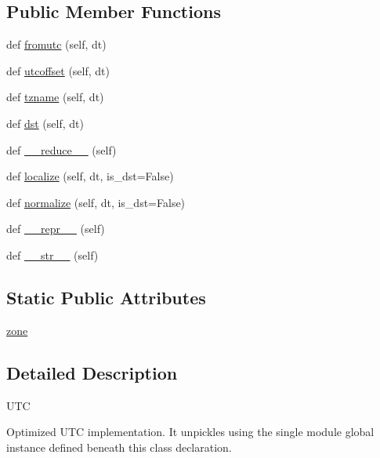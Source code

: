 \subsection*{Public Member Functions}
\begin{DoxyCompactItemize}
\item 
def \hyperlink{classpytz_1_1UTC_a51afc7c64356bb95b55a0ccb82e868ac}{fromutc} (self, dt)
\item 
def \hyperlink{classpytz_1_1UTC_ab4ee42d4c2c53b9c852ee9da9e4d8be6}{utcoffset} (self, dt)
\item 
def \hyperlink{classpytz_1_1UTC_a6cc1374abd563ce95fffade469f3967f}{tzname} (self, dt)
\item 
def \hyperlink{classpytz_1_1UTC_a20e03135c63a6a16845d0ce0c98e8f4f}{dst} (self, dt)
\item 
def \hyperlink{classpytz_1_1UTC_a2fe0fc2e6bf127a2a66f28a6bf495ece}{\+\_\+\+\_\+reduce\+\_\+\+\_\+} (self)
\item 
def \hyperlink{classpytz_1_1UTC_ad867add53d488933e35a47a721257d07}{localize} (self, dt, is\+\_\+dst=False)
\item 
def \hyperlink{classpytz_1_1UTC_ad1f7dad060e31bfa019282128ddcb85c}{normalize} (self, dt, is\+\_\+dst=False)
\item 
def \hyperlink{classpytz_1_1UTC_af0874b98debca6fd5976145a55677391}{\+\_\+\+\_\+repr\+\_\+\+\_\+} (self)
\item 
def \hyperlink{classpytz_1_1UTC_aa527c2357fd281316bfd83e8d15c060b}{\+\_\+\+\_\+str\+\_\+\+\_\+} (self)
\end{DoxyCompactItemize}
\subsection*{Static Public Attributes}
\begin{DoxyCompactItemize}
\item 
\hyperlink{classpytz_1_1UTC_a4930a308980c1b69f5dbf0fcf35c094f}{zone}
\end{DoxyCompactItemize}


\subsection{Detailed Description}
\begin{DoxyVerb}UTC

Optimized UTC implementation. It unpickles using the single module global
instance defined beneath this class declaration.
\end{DoxyVerb}
 

